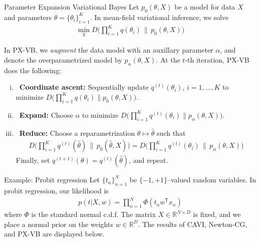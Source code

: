 \documentclass[final]{beamer}
\newlength{\twocolwid}
\begin{document}
\begin{frame}[t]
\begin{columns}[t]
\begin{column}{\twocolwid}


\begin{block}{Parameter Expansion Variational Bayes}
Let $p_0(\theta, X)$ be a model for data $X$ and parameters $\theta = \{\theta_i\}_{i=1}^K$. In mean-field variational inference, we solve%
\begin{align*}
\min_q D\Big( \prod_{i=1}^K q(\theta_i) \,\big\|\, p_0(\theta, X) \Big)
\end{align*}

In PX-VB, we {\itshape augment} the data model with an auxillary parameter $\alpha$, and denote the overparametrized model by $p_\alpha(\theta, X)$. At the $t$-th iteration, PX-VB does the following: 
\begin{enumerate}[(i)]
\item ~{\bf Coordinate ascent: } Sequentially update $q^{(t)}(\theta_i)$, $i=1,...,K$ to minimize $D\big( \prod_{i=1}^K q(\theta_i) \| p_0(\theta, X) \big)$. 
\item ~{\bf Expand: } Choose $\alpha$ to minimize $D\big( \prod_{i=1}^K q^{(t)}(\theta_i) \| p_\alpha(\theta, X) \big)$.
\item ~{\bf Reduce: } Choose a reparametrization $\theta \mapsto \hat\theta$ such that
\begin{align*}
D\Big( \prod_{i=1}^K q^{(t)}(\hat\theta) \,\big\|\, p_{0}(\hat\theta, X) \Big) = D\Big( \prod_{i=1}^K q^{(t)}(\theta_i) \,\big\|\, p_\alpha(\theta, X) \Big)
\end{align*}
Finally, set $q^{(t+1)}(\theta) = q^{(t)}(\hat\theta)$, and repeat. 
\end{enumerate}
\end{block}

\vspace{-1em}

\begin{block}{Example: Probit regression}
Let $\{t_n\}_{n=1}^N$ be $\{-1,+1\}$--valued random variables. In probit regression, our likelihood is
\begin{align*}
p(t | X, w) = \prod_{n=1}^N \Phi(t_nw^\mathsf T x_n)
\end{align*}
where $\Phi$ is the standard normal c.d.f. The matrix $X\in\mathbb R^{N\times D}$ is fixed, and we place a normal prior on the weights $w\in\mathbb R^D$. The results of CAVI, Newton-CG, and PX-VB are displayed below.   \\ %




\end{block}
\end{column}
\end{columns}
\end{frame}
\end{document}
